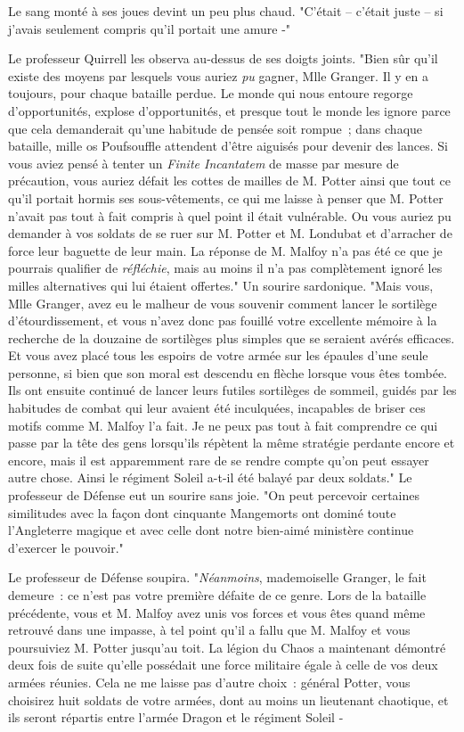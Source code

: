 Le sang monté à ses joues devint un peu plus chaud. "C'était -- c'était juste -- si j'avais seulement compris qu'il portait une amure -"

Le professeur Quirrell les observa au-dessus de ses doigts joints. "Bien sûr qu'il existe des moyens par lesquels vous auriez \emph{pu} gagner, Mlle Granger. Il y en a toujours, pour chaque bataille perdue. Le monde qui nous entoure regorge d'opportunités, explose d'opportunités, et presque tout le monde les ignore parce que cela demanderait qu'une habitude de pensée soit rompue~; dans chaque bataille, mille os Poufsouffle attendent d'être aiguisés pour devenir des lances. Si vous aviez pensé à tenter un \emph{Finite Incantatem} de masse par mesure de précaution, vous auriez défait les cottes de mailles de M. Potter ainsi que tout ce qu'il portait hormis ses sous-vêtements, ce qui me laisse à penser que M. Potter n'avait pas tout à fait compris à quel point il était vulnérable. Ou vous auriez pu demander à vos soldats de se ruer sur M. Potter et M. Londubat et d'arracher de force leur baguette de leur main. La réponse de M. Malfoy n'a pas été ce que je pourrais qualifier de \emph{réfléchie}, mais au moins il n'a pas complètement ignoré les milles alternatives qui lui étaient offertes." Un sourire sardonique. "Mais vous, Mlle Granger, avez eu le malheur de vous souvenir comment lancer le sortilège d'étourdissement, et vous n'avez donc pas fouillé votre excellente mémoire à la recherche de la douzaine de sortilèges plus simples que se seraient avérés efficaces. Et vous avez placé tous les espoirs de votre armée sur les épaules d'une seule personne, si bien que son moral est descendu en flèche lorsque vous êtes tombée. Ils ont ensuite continué de lancer leurs futiles sortilèges de sommeil, guidés par les habitudes de combat qui leur avaient été inculquées, incapables de briser ces motifs comme M. Malfoy l'a fait. Je ne peux pas tout à fait comprendre ce qui passe par la tête des gens lorsqu'ils répètent la même stratégie perdante encore et encore, mais il est apparemment rare de se rendre compte qu'on peut essayer autre chose. Ainsi le régiment Soleil a-t-il été balayé par deux soldats." Le professeur de Défense eut un sourire sans joie. "On peut percevoir certaines similitudes avec la façon dont cinquante Mangemorts ont dominé toute l'Angleterre magique et avec celle dont notre bien-aimé ministère continue d'exercer le pouvoir."

Le professeur de Défense soupira. "\emph{Néanmoins}, mademoiselle Granger, le fait demeure~: ce n'est pas votre première défaite de ce genre. Lors de la bataille précédente, vous et M. Malfoy avez unis vos forces et vous êtes quand même retrouvé dans une impasse, à tel point qu'il a fallu que M. Malfoy et vous poursuiviez M. Potter jusqu'au toit. La légion du Chaos a maintenant démontré deux fois de suite qu'elle possédait une force militaire égale à celle de vos deux armées réunies. Cela ne me laisse pas d'autre choix~: général Potter, vous choisirez huit soldats de votre armées, dont au moins un lieutenant chaotique, et ils seront répartis entre l'armée Dragon et le régiment Soleil -


